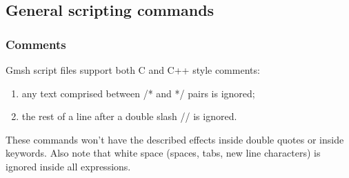 \documentclass[dvipdfmx, 9pt, a4paper]{article}
\numberwithin{equation}{section}
\begin{document}
\subsection{General scripting commands}
\subsubsection{Comments}
Gmsh script files support both C and C++ style comments:
\begin{enumerate}
\item any text comprised between /* and */ pairs is ignored;
\item the rest of a line after a double slash // is ignored.
\end{enumerate}
These commands won't have the described effects inside double quotes or inside keywords. Also note that white space (spaces, tabs, new line characters) is ignored inside all expressions.
\end{document}
